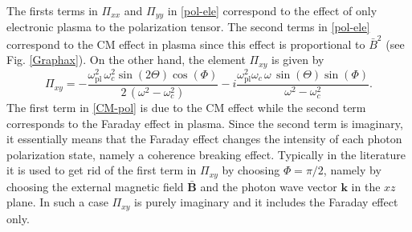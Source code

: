 \documentclass[a4paper,11pt]{article}
\newcommand{\bs}{\boldsymbol}
\begin{document}
The firsts terms in $\Pi_{xx}$ and $\Pi_{yy}$ in \eqref{pol-ele} correspond to the effect of only electronic plasma to the polarization tensor. The second terms in \eqref{pol-ele} correspond to the CM effect in plasma since this effect is proportional to $\bar B^2$ (see Fig. \ref{Graphax}). On the other hand, the element $\Pi_{xy}$ is given by
\begin{equation}\label{CM-pol}
\Pi_{xy}=-\frac{\omega_\text{pl}^2\,\omega_c^2 \sin(2 \Theta)\cos(\Phi)}{2\,(\omega^2-\omega_c^2)} - i \frac{\omega_\text{pl}^2\omega_c\,\omega\, \sin(\Theta)\sin(\Phi)}{\omega^2-\omega_c^2}.
\end{equation}
The first term in \eqref{CM-pol} is due to the CM effect while the second term corresponds to the Faraday effect in plasma. Since the second term is imaginary, it essentially means that the Faraday effect changes the intensity of each photon polarization state, namely a coherence breaking effect. Typically in the literature it is used to get rid of the first term in $\Pi_{xy}$ by choosing $\Phi=\pi/2$, namely by choosing the external magnetic field $\bar{\bs B}$ and the photon wave vector $\bs k$ in the $xz$ plane. In such a case $\Pi_{xy}$ is purely imaginary and it includes the Faraday effect only. 
\end{document}
